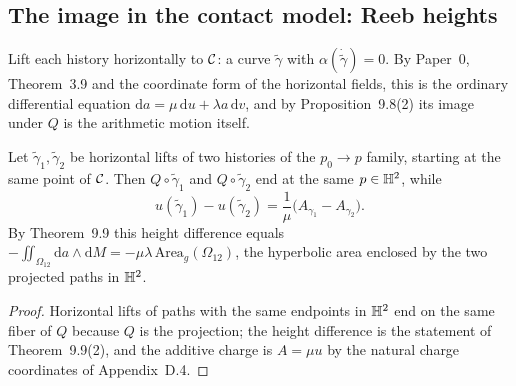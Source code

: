 \subsection{The image in the contact model: Reeb heights}

Lift each history horizontally to $\mathcal{C}$: a curve $\tilde\gamma$ with
$\alpha(\dot{\tilde\gamma})=0$.  By Paper~0, Theorem~3.9 and the coordinate
form of the horizontal fields, this is the ordinary differential equation
$\mathrm da=\mu\,\mathrm du+\lambda a\,\mathrm dv$, and by
Proposition~9.8(2) its image under $Q$ is the arithmetic motion itself.

\begin{proposition}
\label{prop:reeb-heights}
Let $\tilde\gamma_1,\tilde\gamma_2$ be horizontal lifts of two histories of the
$p_0\to p$ family, starting at the same point of $\mathcal{C}$.  Then
$Q\circ\tilde\gamma_1$ and $Q\circ\tilde\gamma_2$ end at the same $p\in\mathbb{H}^2$,
while
\[
  u(\tilde\gamma_1)-u(\tilde\gamma_2)=\frac{1}{\mu}\bigl(A_{\gamma_1}-A_{\gamma_2}\bigr).
\]
By Theorem~9.9 this height difference equals
$-\iint_{\Omega_{12}}\mathrm da\wedge\mathrm dM=-\mu\lambda\,\mathrm{Area}_g(\Omega_{12})$,
the hyperbolic area enclosed by the two projected paths in $\mathbb{H}^2$.
\end{proposition}

\begin{proof}
Horizontal lifts of paths with the same endpoints in $\mathbb{H}^2$ end on the same
fiber of $Q$ because $Q$ is the projection; the height difference is the
statement of Theorem~9.9(2), and the additive charge is $A=\mu u$ by the natural
charge coordinates of Appendix~D.4.
\end{proof}

